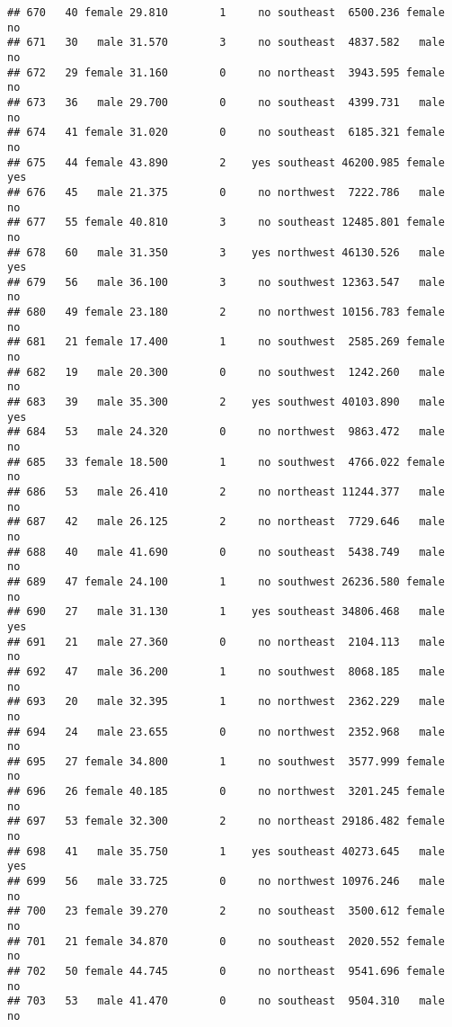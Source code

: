 \documentclass[
]{article}
\begin{document}
\begin{verbatim}
## 670   40 female 29.810        1     no southeast  6500.236 female       no
## 671   30   male 31.570        3     no southeast  4837.582   male       no
## 672   29 female 31.160        0     no northeast  3943.595 female       no
## 673   36   male 29.700        0     no southeast  4399.731   male       no
## 674   41 female 31.020        0     no southeast  6185.321 female       no
## 675   44 female 43.890        2    yes southeast 46200.985 female      yes
## 676   45   male 21.375        0     no northwest  7222.786   male       no
## 677   55 female 40.810        3     no southeast 12485.801 female       no
## 678   60   male 31.350        3    yes northwest 46130.526   male      yes
## 679   56   male 36.100        3     no southwest 12363.547   male       no
## 680   49 female 23.180        2     no northwest 10156.783 female       no
## 681   21 female 17.400        1     no southwest  2585.269 female       no
## 682   19   male 20.300        0     no southwest  1242.260   male       no
## 683   39   male 35.300        2    yes southwest 40103.890   male      yes
## 684   53   male 24.320        0     no northwest  9863.472   male       no
## 685   33 female 18.500        1     no southwest  4766.022 female       no
## 686   53   male 26.410        2     no northeast 11244.377   male       no
## 687   42   male 26.125        2     no northeast  7729.646   male       no
## 688   40   male 41.690        0     no southeast  5438.749   male       no
## 689   47 female 24.100        1     no southwest 26236.580 female       no
## 690   27   male 31.130        1    yes southeast 34806.468   male      yes
## 691   21   male 27.360        0     no northeast  2104.113   male       no
## 692   47   male 36.200        1     no southwest  8068.185   male       no
## 693   20   male 32.395        1     no northwest  2362.229   male       no
## 694   24   male 23.655        0     no northwest  2352.968   male       no
## 695   27 female 34.800        1     no southwest  3577.999 female       no
## 696   26 female 40.185        0     no northwest  3201.245 female       no
## 697   53 female 32.300        2     no northeast 29186.482 female       no
## 698   41   male 35.750        1    yes southeast 40273.645   male      yes
## 699   56   male 33.725        0     no northwest 10976.246   male       no
## 700   23 female 39.270        2     no southeast  3500.612 female       no
## 701   21 female 34.870        0     no southeast  2020.552 female       no
## 702   50 female 44.745        0     no northeast  9541.696 female       no
## 703   53   male 41.470        0     no southeast  9504.310   male       no

\end{verbatim}
\end{document}

